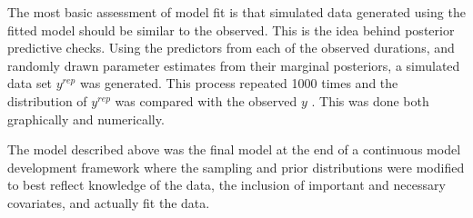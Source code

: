 \documentclass[12pt,letterpaper]{article}
\begin{document}
The most basic assessment of model fit is that simulated data generated using the fitted model should be similar to the observed. This is the idea behind posterior predictive checks. Using the predictors from each of the observed durations, and randomly drawn parameter estimates from their marginal posteriors, a simulated data set \(y^{rep}\) was generated. This process repeated 1000 times and the distribution of \(y^{rep}\) was compared with the observed \(y\) \citep{Gelman2013d}. This was done both graphically and numerically.

The model described above was the final model at the end of a continuous model development framework where the sampling and prior distributions were modified to best reflect knowledge of the data, the inclusion of important and necessary covariates, and actually fit the data.

\end{document}

